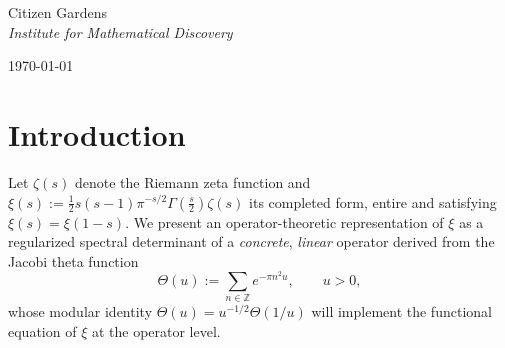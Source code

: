 \documentclass[11pt]{article}
\numberwithin{equation}{section}
\theoremstyle{definition}
\theoremstyle{remark}
\newcommand{\R}{\mathbb{R}}
\newcommand{\Dettwo}{\operatorname{det}_2}
\newcommand{\1}{\mathbbm{1}}
\begin{document}
\title{\vspace{A Determinant Representation of the Riemann ξ-Function via a
Theta–Mellin Operator}}
\author{Ryan O. Van Gelder, Luis Morat´o de Dalmases, \& Tyler Van Osdol }
\date{\vspace{1em}}
\maketitle

\begin{center}

\LARGE{Citizen Gardens} 
\vspace{0.5cm} \\
\textit{Institute for Mathematical Discovery} \\
\vspace{0.5cm}
{\normalsize \today \par}
\end{center}
\vspace{3cm}    

\begin{abstract}
We construct a concrete, linear, Hilbert--Schmidt operator family \(X(s)\) on \(H=L^2((0,\infty),dx/x)\) whose Carleman--Fredholm regularized determinant recovers the completed Riemann \(\xi\)-function:
\[
\Dettwo\!\big(I-X(s)\big) \;=\; C(s)\,\xi(s),
\]
where \(C(s)\) is an entire, nowhere-vanishing factor satisfying \(C(1-s)=C(s)\) and \(C(\R)\subset\R\). The operator is built canonically from the Jacobi theta function; the functional equation follows from a unitary conjugation implementing \(s\mapsto 1-s\). We give a rigorous proof that isolates the \(k=1\) contribution (which equals \(\xi'(s)/\xi(s)\)) and shows that all remaining \(k\ge 2\) contributions integrate to an entire function of \(s\). We also outline a reproducible numerical appendix verifying the identity on the critical line and formulate precise, falsifiable milestones toward a Hilbert--Pólya operator.
\end{abstract}
\newpage
\tableofcontents

\section{Introduction}

Let \(\zeta(s)\) denote the Riemann zeta function and \(\xi(s):=\tfrac12 s(s-1)\pi^{-s/2}\Gamma(\tfrac{s}{2})\zeta(s)\) its completed form, entire and satisfying \(\xi(s)=\xi(1-s)\). We present an operator-theoretic representation of \(\xi\) as a regularized spectral determinant of a \emph{concrete}, \emph{linear} operator derived from the Jacobi theta function
\[
\Theta(u):=\sum_{n\in\mathbb{Z}} e^{-\pi n^2 u}, \qquad u>0,
\]
whose modular identity \(\Theta(u)=u^{-1/2}\Theta(1/u)\) will implement the functional equation of \(\xi\) at the operator level.
\end{document}

